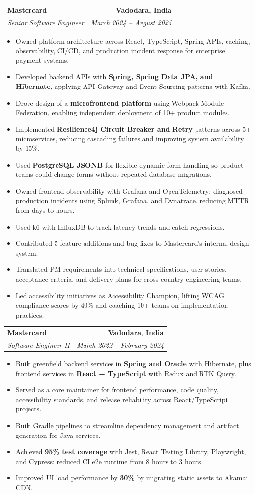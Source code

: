 \documentclass[letterpaper,11pt]{article}
\makeatletter
\newcommand{\resumeItem}[1]{
  \item\small{
    {#1 \vspace{-3pt}}
  }
}
\newcommand{\resumeSubheading}[4]{
  \vspace{-3pt}\item
    \begin{tabular*}{1.0\textwidth}[t]{l@{\extracolsep{\fill}}r}
      \textbf{#1} & \textbf{\small #2} \\
      \textit{\small#3} & \textit{\small #4} \\
    \end{tabular*}\vspace{-4pt}
}
\newcommand{\resumeItemListStart}{\begin{itemize}}
\newcommand{\resumeItemListEnd}{\end{itemize}\vspace{0pt}}
\makeatother
\begin{document}
    \resumeSubheading
      {Mastercard}{Vadodara, India}
      {Senior Software Engineer}{March 2024 -- August 2025}
      \resumeItemListStart
        \resumeItem{Owned platform architecture across React, TypeScript, Spring APIs, caching, observability, CI/CD, and production incident response for enterprise payment systems.}
        \resumeItem{Developed backend APIs with \textbf{Spring, Spring Data JPA, and Hibernate}, applying API Gateway and Event Sourcing patterns with Kafka.}
        \resumeItem{Drove design of a \textbf{microfrontend platform} using Webpack Module Federation, enabling independent deployment of 10+ product modules.}
        \resumeItem{Implemented \textbf{Resilience4j Circuit Breaker and Retry} patterns across 5+ microservices, reducing cascading failures and improving system availability by 15\%.}
        \resumeItem{Used \textbf{PostgreSQL JSONB} for flexible dynamic form handling so product teams could change forms without repeated database migrations.}
        \resumeItem{Owned frontend observability with Grafana and OpenTelemetry; diagnosed production incidents using Splunk, Grafana, and Dynatrace, reducing MTTR from days to hours.}
        \resumeItem{Used k6 with InfluxDB to track latency trends and catch regressions.}
        \resumeItem{Contributed 5 feature additions and bug fixes to Mastercard's internal design system.}
        \resumeItem{Translated PM requirements into technical specifications, user stories, acceptance criteria, and delivery plans for cross-country engineering teams.}
        \resumeItem{Led accessibility initiatives as Accessibility Champion, lifting WCAG compliance scores by 40\% and coaching 10+ teams on implementation practices.}
      \resumeItemListEnd

    \resumeSubheading
      {Mastercard}{Vadodara, India}
      {Software Engineer II}{March 2022 -- February 2024}
      \resumeItemListStart
        \resumeItem{Built greenfield backend services in \textbf{Spring and Oracle} with Hibernate, plus frontend services in \textbf{React + TypeScript} with Redux and RTK Query.}
        \resumeItem{Served as a core maintainer for frontend performance, code quality, accessibility standards, and release reliability across React/TypeScript projects.}
        \resumeItem{Built Gradle pipelines to streamline dependency management and artifact generation for Java services.}
        \resumeItem{Achieved \textbf{95\% test coverage} with Jest, React Testing Library, Playwright, and Cypress; reduced CI e2e runtime from 8 hours to 3 hours.}
        \resumeItem{Improved UI load performance by \textbf{30\%} by migrating static assets to Akamai CDN.}
      \resumeItemListEnd
\end{document}
